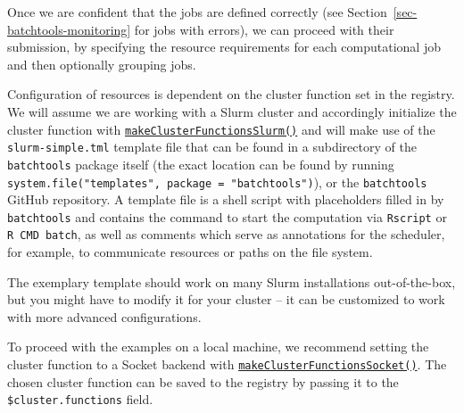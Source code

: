 Once we are confident that the jobs are defined correctly (see
Section~\ref{sec-batchtools-monitoring} for jobs with errors), we can
proceed with their submission, by specifying the resource requirements
for each computational job and then optionally grouping jobs.

Configuration of resources is dependent on the cluster function set in
the registry. We will assume we are working with a Slurm
cluster and accordingly initialize the cluster function with
\href{https://www.rdocumentation.org/packages/batchtools/topics/makeClusterFunctionsSlurm}{\texttt{makeClusterFunctionsSlurm()}}
and will make use of the \texttt{slurm-simple.tml} template file that
can be found in a subdirectory of the \texttt{batchtools} package itself
(the exact location can be found by running
\texttt{system.file("templates",\ package\ =\ "batchtools")}), or the
\texttt{batchtools} GitHub repository. A template file is a shell script
with placeholders filled in by \texttt{batchtools} and contains the
command to start the computation via \texttt{Rscript} or
\texttt{R\ CMD\ batch}, as well as comments which serve as annotations
for the scheduler, for example, to communicate resources or paths on the
file system.

The exemplary template should work on many Slurm installations
out-of-the-box, but you might have to modify it for your cluster -- it
can be customized to work with more advanced configurations.

\begin{Shaded}
\begin{Highlighting}[]
\OtherTok{=} \NormalTok{(} \NormalTok{)}
\end{Highlighting}
\end{Shaded}

To proceed with the examples on a local machine, we recommend setting
the cluster function to a Socket backend with
\href{https://www.rdocumentation.org/packages/batchtools/topics/makeClusterFunctionsSocket}{\texttt{makeClusterFunctionsSocket()}}.
The chosen cluster function can be saved to the registry by passing it
to the \texttt{\$cluster.functions} field.

\begin{Shaded}
\begin{Highlighting}[]
\SpecialCharTok{$}\OtherTok{=}
\NormalTok{(}
\end{Highlighting}
\end{Shaded}

